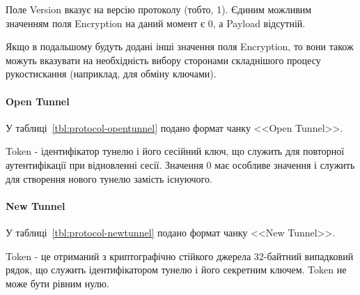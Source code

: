 Поле Version вказує на версію протоколу (тобто, 1). Єдиним можливим значенням
поля Encryption на даний момент є 0, а Payload відсутній.

Якщо в подальшому будуть додані інші значення поля Encryption, то вони також
можуть вказувати на необхідність вибору сторонами складнішого процесу
рукостискання (наприклад, для обміну ключами).

\paragraph{Open Tunnel}

У таблиці~\ref{tbl:protocol-opentunnel} подано формат чанку <<Open Tunnel>>.

\begin{table}[htbp]
\end{table}

Token - ідентифікатор тунелю і його сесійний ключ, що служить для повторної
аутентифікації при відновленні сесії.  Значення 0 має особливе значення і
служить для створення нового тунелю замість існуючого.

\paragraph{New Tunnel}

У таблиці~\ref{tbl:protocol-newtunnel} подано формат чанку <<New Tunnel>>.

\begin{table}[htbp]
\end{table}

Token - це отриманий з криптографічно стійкого джерела 32-байтний випадковий
рядок, що служить ідентифікатором тунелю і його секретним ключем. Token не може
бути рівним нулю.

